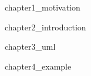 
{chapter1_motivation}

{chapter2_introduction}
\newpage

{chapter3_uml}
\newpage

{chapter4_example}